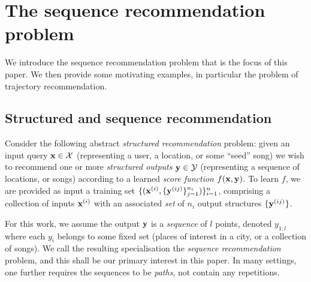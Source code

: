 
\secmoveup
\section{The sequence recommendation problem}
\label{sec:recseq}
\textmoveup

We introduce the sequence recommendation problem that is the focus of this paper.
We then provide some motivating examples, in particular the problem of trajectory recommendation.


%
%

%
\subsection{Structured and sequence recommendation}
\label{sec:seqrec-defn}

Consider the following abstract
\emph{structured recommendation} problem:
given an input query $\mathbf{x} \in \mathcal{X}$ (representing \eg a user, a location, or some ``seed'' song)
we wish to recommend one or more \emph{structured outputs} $\mathbf{y} \in \mathcal{Y}$ (representing \eg a sequence of locations, or songs)
according to a learned \emph{score function} $f(\mathbf{x},\mathbf{y})$.
To learn $f$,
we are provided as input a training set
$\{ ( \mathbf{x}^{({i})}, \{ \mathbf{y}^{({ij})} \}_{j=1}^{n_i} ) \}_{i=1}^{n}$,
comprising a collection of inputs $\mathbf{x}^{({i})}$ with an associated \emph{set} of $n_i$ output structures $\{ \mathbf{y}^{({ij})} \}$.

For this work, we assume the output $\mathbf{y}$ is a \emph{sequence} of $l$ points, denoted $y_{1:l}$
where each $y_i$ belongs to some fixed set (\eg places of interest in a city, or a collection of songs).
We call the resulting specialisation the \emph{sequence recommendation} problem,
and this shall be our primary interest in this paper.
In many settings, one further requires the sequences to be \emph{paths}, \ie not contain any repetitions.

